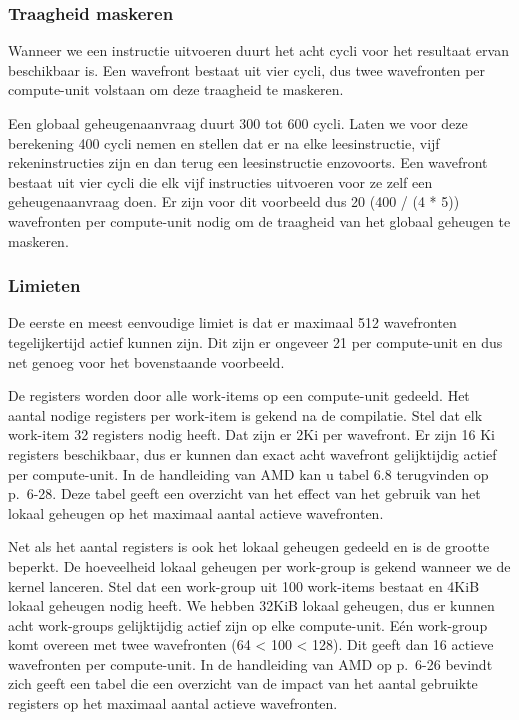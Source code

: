 \subsubsection{Traagheid maskeren}
Wanneer we een instructie uitvoeren duurt het acht cycli voor het resultaat ervan beschikbaar is. Een wavefront bestaat uit vier cycli, dus twee wavefronten per compute-unit volstaan om deze traagheid te maskeren.

Een globaal geheugenaanvraag duurt 300 tot 600 cycli. Laten we voor deze berekening 400 cycli nemen en stellen dat er na elke leesinstructie, vijf rekeninstructies zijn en dan terug een leesinstructie enzovoorts. Een wavefront bestaat uit vier cycli die elk vijf instructies uitvoeren voor ze zelf een geheugenaanvraag doen. Er zijn voor dit voorbeeld dus 20 (400 / (4 * 5)) wavefronten per compute-unit nodig om de traagheid van het globaal geheugen te maskeren.

\subsubsection{Limieten}
De eerste en meest eenvoudige limiet is dat er maximaal 512 wavefronten tegelijkertijd actief kunnen zijn. Dit zijn er ongeveer 21 per compute-unit en dus net genoeg voor het bovenstaande voorbeeld.

De registers worden door alle work-items op een compute-unit gedeeld. Het aantal nodige registers per work-item is gekend na de compilatie. Stel dat elk work-item 32 registers nodig heeft. Dat zijn er 2Ki per wavefront. Er zijn 16 Ki registers beschikbaar, dus er kunnen dan exact acht wavefront gelijktijdig actief per compute-unit. In de handleiding van AMD \cite{amd} kan u tabel 6.8 terugvinden op p.~6-28. Deze tabel geeft een overzicht van het effect van het gebruik van het lokaal geheugen op het maximaal aantal actieve wavefronten.

Net als het aantal registers is ook het lokaal geheugen gedeeld en is de grootte beperkt. De hoeveelheid lokaal geheugen per work-group is gekend wanneer we de kernel lanceren. Stel dat een work-group uit 100 work-items bestaat en 4KiB lokaal geheugen nodig heeft. We hebben 32KiB lokaal geheugen, dus er kunnen acht work-groups gelijktijdig actief zijn op elke compute-unit. E\'en work-group komt overeen met twee wavefronten (64 < 100 < 128). Dit geeft dan 16 actieve wavefronten per compute-unit.  In de handleiding van AMD \cite{amd} op p.~6-26 bevindt zich geeft een tabel die een overzicht van de impact van het aantal gebruikte registers op het maximaal aantal actieve wavefronten.


